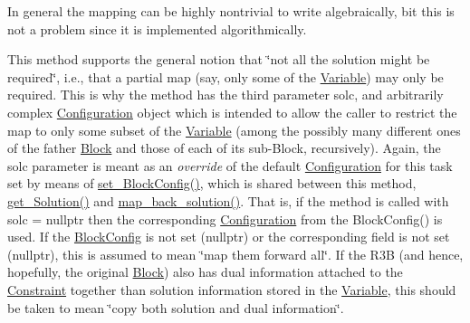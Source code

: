 \begin{DoxyItemize}
\item In general the mapping can be highly nontrivial to write algebraically, bit this is not a problem since it is implemented algorithmically.
\item This method supports the general notion that \char`\"{}not all the solution might
  be required\char`\"{}, i.\+e., that a partial map (say, only some of the \mbox{\hyperlink{class_s_m_spp__di__unipi__it_1_1_variable}{Variable}}) may only be required. This is why the method has the third parameter solc, and arbitrarily complex \mbox{\hyperlink{class_s_m_spp__di__unipi__it_1_1_configuration}{Configuration}} object which is intended to allow the caller to restrict the map to only some subset of the \mbox{\hyperlink{class_s_m_spp__di__unipi__it_1_1_variable}{Variable}} (among the possibly many different ones of the father \mbox{\hyperlink{class_s_m_spp__di__unipi__it_1_1_block}{Block}} and those of each of its sub-\/\+Block, recursively). Again, the solc parameter is meant as an {\itshape override} of the default \mbox{\hyperlink{class_s_m_spp__di__unipi__it_1_1_configuration}{Configuration}} for this task set by means of \mbox{\hyperlink{class_s_m_spp__di__unipi__it_1_1_block_a18d411b740a47db00d15083c5c7ef2ba}{set\+\_\+\+Block\+Config()}}, which is shared between this method, \mbox{\hyperlink{class_s_m_spp__di__unipi__it_1_1_block_a1db67c2f65111af4314e79dfc81ba597}{get\+\_\+\+Solution()}} and \mbox{\hyperlink{class_s_m_spp__di__unipi__it_1_1_block_a04f0a8a608fcc3ded227c2552f67f1a3}{map\+\_\+back\+\_\+solution()}}. That is, if the method is called with solc = nullptr then the corresponding \mbox{\hyperlink{class_s_m_spp__di__unipi__it_1_1_configuration}{Configuration}} from the Block\+Config() is used. If the \mbox{\hyperlink{class_s_m_spp__di__unipi__it_1_1_block_config}{Block\+Config}} is not set (nullptr) or the corresponding field is not set (nullptr), this is assumed to mean \char`\"{}map them forward all\char`\"{}. If the R3B (and hence, hopefully, the original \mbox{\hyperlink{class_s_m_spp__di__unipi__it_1_1_block}{Block}}) also has dual information attached to the \mbox{\hyperlink{class_s_m_spp__di__unipi__it_1_1_constraint}{Constraint}} together than solution information stored in the \mbox{\hyperlink{class_s_m_spp__di__unipi__it_1_1_variable}{Variable}}, this should be taken to mean \char`\"{}copy both solution and dual information\char`\"{}.

\end{DoxyItemize}

